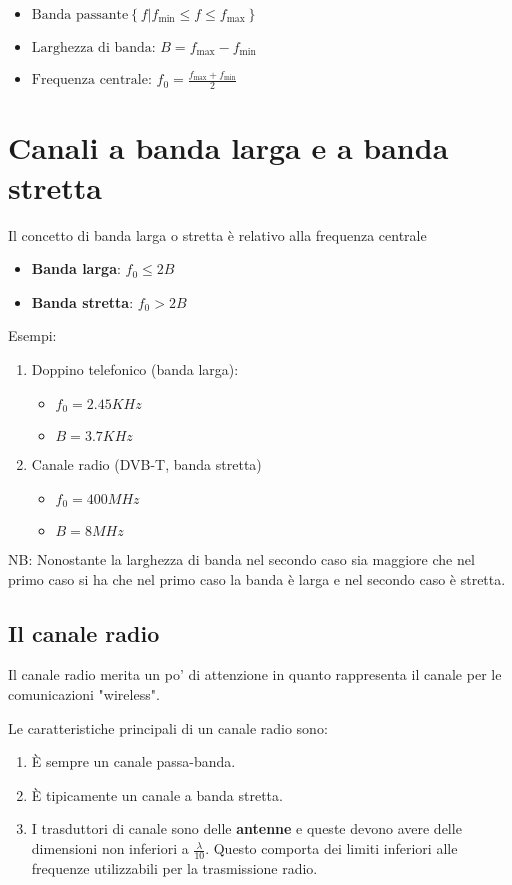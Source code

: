 \documentclass{article}
\begin{document}
\begin{itemize}
    \item $\text{Banda passante} \left\{ f \vert f_{\text{min}} \leq f \leq f_{\text{max}} \right\}$
    \item $\text{Larghezza di banda: } B = f_{\text{max}} - f_{\text{min}} $
    \item $\text{Frequenza centrale: } f_0 = \frac{f_{\text{max}} + f_{\text{min}}}{2}$
\end{itemize}



\section*{Canali a banda larga e a banda stretta}
Il concetto di banda larga o stretta è relativo alla frequenza centrale
\begin{itemize}
    \item \textbf{Banda larga}: $f_0 \leq 2B$
    \item \textbf{Banda stretta}: $f_0 > 2B$
\end{itemize}


Esempi:
\begin{enumerate}
  \item Doppino telefonico (banda larga): 
\begin{itemize}
    \item $f_0 = 2.45 KHz$
    \item $B = 3.7 KHz$
\end{itemize}
    \item Canale radio (DVB-T, banda stretta) 
    \begin{itemize}
        \item $f_0 = 400 MHz$ 
        \item $B = 8 MHz$
    \end{itemize}
\end{enumerate}

NB: Nonostante la larghezza di banda nel secondo caso sia maggiore che nel primo caso si ha che nel primo caso la banda è larga e nel secondo caso è stretta.

\subsection*{Il canale radio}
Il canale radio merita un po' di attenzione in quanto rappresenta il canale per le comunicazioni "wireless".



Le caratteristiche principali di un canale radio sono:
\begin{enumerate}
    \item È sempre un canale passa-banda.
    \item È tipicamente un canale a banda stretta.
    \item I trasduttori di canale sono delle \textbf{antenne} e queste devono avere delle dimensioni non inferiori a $\frac{\lambda}{10}$. Questo comporta dei limiti inferiori alle frequenze utilizzabili per la trasmissione radio.
\end{enumerate}
\end{document}
